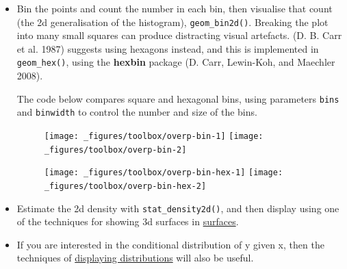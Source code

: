 \begin{itemize}
\item
  Bin the points and count the number in each bin, then visualise that
  count (the 2d generalisation of the histogram),
  \texttt{geom\_bin2d()}. Breaking the plot into many small squares can
  produce distracting visual artefacts. (D. B. Carr et al. 1987)
  suggests using hexagons instead, and this is implemented in
  \texttt{geom\_hex()}, using the \textbf{hexbin} package (D. Carr,
  Lewin-Koh, and Maechler 2008). 

  The code below compares square and hexagonal bins, using parameters
  \texttt{bins} and \texttt{binwidth} to control the number and size of
  the bins.  
   

\begin{Shaded}
\begin{Highlighting}[]
\StringTok{ }\NormalTok{()}
\StringTok{ }\NormalTok{(} \NormalTok{)}
\end{Highlighting}
\end{Shaded}

  \begin{figure}[H]
    \texttt{[image: \_figures/toolbox/overp-bin-1]}%
    \texttt{[image: \_figures/toolbox/overp-bin-2]}
  \end{figure}

\begin{Shaded}
\begin{Highlighting}[]
\StringTok{ }\NormalTok{()}
\StringTok{ }\NormalTok{(} \NormalTok{)}
\end{Highlighting}
\end{Shaded}

  \begin{figure}[H]
    \texttt{[image: \_figures/toolbox/overp-bin-hex-1]}%
    \texttt{[image: \_figures/toolbox/overp-bin-hex-2]}
  \end{figure}
\item
  Estimate the 2d density with \texttt{stat\_density2d()}, and then
  display using one of the techniques for showing 3d surfaces in
  \hyperref[sec:surface]{surfaces}.
\item
  If you are interested in the conditional distribution of y given x,
  then the techniques of \hyperref[sub:distribution]{displaying
  distributions} will also be useful.
\end{itemize}

